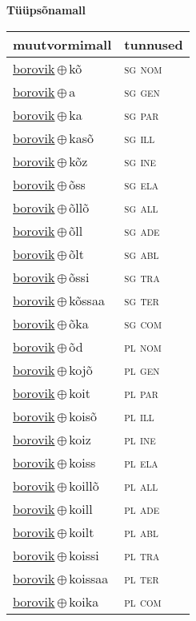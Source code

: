 

\vspace{3.5em}
\noindent \begin{minipage}{\textwidth}
\noindent \textbf{Tüüpsõnamall \,}\\

\begin{sideways}
\begin{tabular}{l l}
muutvormimall & tunnused \\
\hline
\underline{borovik}\,$\oplus$\,kõ & \textsc{ sg nom } \\
\underline{borovik}\,$\oplus$\,a & \textsc{ sg gen } \\
\underline{borovik}\,$\oplus$\,ka & \textsc{ sg par } \\
\underline{borovik}\,$\oplus$\,kasõ & \textsc{ sg ill } \\
\underline{borovik}\,$\oplus$\,kõz & \textsc{ sg ine } \\
\underline{borovik}\,$\oplus$\,õss & \textsc{ sg ela } \\
\underline{borovik}\,$\oplus$\,õllõ & \textsc{ sg all } \\
\underline{borovik}\,$\oplus$\,õll & \textsc{ sg ade } \\
\underline{borovik}\,$\oplus$\,õlt & \textsc{ sg abl } \\
\underline{borovik}\,$\oplus$\,õssi & \textsc{ sg tra } \\
\underline{borovik}\,$\oplus$\,kõssaa & \textsc{ sg ter } \\
\underline{borovik}\,$\oplus$\,õka & \textsc{ sg com } \\
\underline{borovik}\,$\oplus$\,õd & \textsc{ pl nom } \\
\underline{borovik}\,$\oplus$\,kojõ & \textsc{ pl gen } \\
\underline{borovik}\,$\oplus$\,koit & \textsc{ pl par } \\
\underline{borovik}\,$\oplus$\,koisõ & \textsc{ pl ill } \\
\underline{borovik}\,$\oplus$\,koiz & \textsc{ pl ine } \\
\underline{borovik}\,$\oplus$\,koiss & \textsc{ pl ela } \\
\underline{borovik}\,$\oplus$\,koillõ & \textsc{ pl all } \\
\underline{borovik}\,$\oplus$\,koill & \textsc{ pl ade } \\
\underline{borovik}\,$\oplus$\,koilt & \textsc{ pl abl } \\
\underline{borovik}\,$\oplus$\,koissi & \textsc{ pl tra } \\
\underline{borovik}\,$\oplus$\,koissaa & \textsc{ pl ter } \\
\underline{borovik}\,$\oplus$\,koika & \textsc{ pl com } \\
\end{tabular}
\end{sideways}
\label{tab:tüüpsõnamall-borovikkõ}

\end{minipage}

